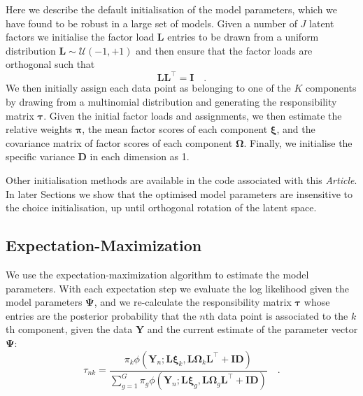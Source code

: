 \documentclass[twocolumn]{aastex61}
\newcommand{\vect}[1]{\boldsymbol{\mathbf{#1}}}
\renewcommand{\vec}[1]{\vect{#1}}
\newcommand{\weight}{\pi}
\newcommand{\data}{\textbf{Y}}
\newcommand{\vecdata}{\vec\data}
\newcommand{\transpose}{^\intercal}
\newcommand{\eye}{\textbf{I}}
\newcommand{\factorloads}{\textbf{L}}
\newcommand{\specificvariance}{\vec{D}}
\newcommand{\scoremeans}{\vec\xi}
\newcommand{\scorecovs}{\vec\Omega}
\newcommand{\numdata}{n}
\newcommand{\NumLatentFactors}{J}
\newcommand{\NumComponents}{K}
\newcommand{\numcomponents}{k}
\begin{document}
Here we describe the default initialisation of the model parameters, which
we have found to be robust in a large set of models. Given a number of
$\NumLatentFactors$ latent factors we initialise the factor load
$\factorloads$ entries to be drawn from a uniform distribution
$\factorloads \sim \mathcal{U}\left(-1, +1\right)$ and then ensure that
the factor loads are orthogonal such that
\begin{equation}
	\factorloads \factorloads\transpose = \eye \quad .
\end{equation}
% 	
We then initially assign each data point as belonging to one of the
$\NumComponents$ components by drawing from a multinomial distribution
and generating the responsibility matrix $\vec\tau$. Given the initial
factor loads and assignments, we then estimate the relative weights
$\vec\pi$, the mean factor scores of each component $\scoremeans$, and
the covariance matrix of factor scores of each component $\scorecovs$.
Finally, we initialise the specific variance $\specificvariance$ in each
dimension as 1. 

Other initialisation methods are available in the code 
associated with this \emph{Article}. In later Sections we show that 
the optimised model parameters are insensitive to the choice initialisation, 
up until orthogonal rotation of the latent space.


\subsection{Expectation-Maximization}

We use the expectation-maximization algorithm to estimate the model parameters.
With each expectation step we evaluate the log likelihood given the model 
parameters $\vec\Psi$, and we re-calculate the responsibility 
matrix $\vec\tau$ whose entries are the posterior probability
that the $\numdata$th data point is associated to the $\numcomponents$th component,
given the data $\vecdata$ and the current estimate of the 
parameter vector $\vec\Psi$:
\begin{equation}
	\tau_{\numdata\numcomponents} = \frac{\weight_\numcomponents\phi(\vecdata_\numdata;\factorloads\scoremeans_\numcomponents, \factorloads\scorecovs_\numcomponents\factorloads\transpose + \eye\specificvariance)}{\sum_{g=1}^{G}\weight_g\phi(\vecdata_\numdata;\factorloads\scoremeans_g, \factorloads\scorecovs_g\factorloads\transpose + \eye\specificvariance)} \quad .
\end{equation}
\end{document}
